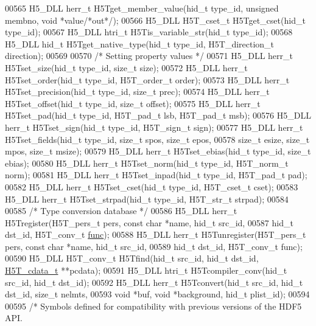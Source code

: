 \begin{DoxyCode}
00565 H5\_DLL herr\_t H5Tget\_member\_value(hid\_t type\_id, \textcolor{keywordtype}{unsigned} membno, \textcolor{keywordtype}{void} *value\textcolor{comment}{/*out*/});
00566 H5\_DLL H5T\_cset\_t H5Tget\_cset(hid\_t type\_id);
00567 H5\_DLL htri\_t H5Tis\_variable\_str(hid\_t type\_id);
00568 H5\_DLL hid\_t H5Tget\_native\_type(hid\_t type\_id, H5T\_direction\_t direction);
00569 
00570 \textcolor{comment}{/* Setting property values */}
00571 H5\_DLL herr\_t H5Tset\_size(hid\_t type\_id, \textcolor{keywordtype}{size\_t} size);
00572 H5\_DLL herr\_t H5Tset\_order(hid\_t type\_id, H5T\_order\_t order);
00573 H5\_DLL herr\_t H5Tset\_precision(hid\_t type\_id, \textcolor{keywordtype}{size\_t} prec);
00574 H5\_DLL herr\_t H5Tset\_offset(hid\_t type\_id, \textcolor{keywordtype}{size\_t} offset);
00575 H5\_DLL herr\_t H5Tset\_pad(hid\_t type\_id, H5T\_pad\_t lsb, H5T\_pad\_t msb);
00576 H5\_DLL herr\_t H5Tset\_sign(hid\_t type\_id, H5T\_sign\_t sign);
00577 H5\_DLL herr\_t H5Tset\_fields(hid\_t type\_id, \textcolor{keywordtype}{size\_t} spos, \textcolor{keywordtype}{size\_t} epos,
00578                  \textcolor{keywordtype}{size\_t} esize, \textcolor{keywordtype}{size\_t} mpos, \textcolor{keywordtype}{size\_t} msize);
00579 H5\_DLL herr\_t H5Tset\_ebias(hid\_t type\_id, \textcolor{keywordtype}{size\_t} ebias);
00580 H5\_DLL herr\_t H5Tset\_norm(hid\_t type\_id, H5T\_norm\_t norm);
00581 H5\_DLL herr\_t H5Tset\_inpad(hid\_t type\_id, H5T\_pad\_t pad);
00582 H5\_DLL herr\_t H5Tset\_cset(hid\_t type\_id, H5T\_cset\_t cset);
00583 H5\_DLL herr\_t H5Tset\_strpad(hid\_t type\_id, H5T\_str\_t strpad);
00584 
00585 \textcolor{comment}{/* Type conversion database */}
00586 H5\_DLL herr\_t H5Tregister(H5T\_pers\_t pers, \textcolor{keyword}{const} \textcolor{keywordtype}{char} *name, hid\_t src\_id,
00587                hid\_t dst\_id, H5T\_conv\_t \hyperlink{structfunc}{func});
00588 H5\_DLL herr\_t H5Tunregister(H5T\_pers\_t pers, \textcolor{keyword}{const} \textcolor{keywordtype}{char} *name, hid\_t src\_id,
00589                  hid\_t dst\_id, H5T\_conv\_t func);
00590 H5\_DLL H5T\_conv\_t H5Tfind(hid\_t src\_id, hid\_t dst\_id, \hyperlink{struct_h5_t__cdata__t}{H5T\_cdata\_t} **pcdata);
00591 H5\_DLL htri\_t H5Tcompiler\_conv(hid\_t src\_id, hid\_t dst\_id);
00592 H5\_DLL herr\_t H5Tconvert(hid\_t src\_id, hid\_t dst\_id, \textcolor{keywordtype}{size\_t} nelmts,
00593               \textcolor{keywordtype}{void} *buf, \textcolor{keywordtype}{void} *background, hid\_t plist\_id);
00594 
00595 \textcolor{comment}{/* Symbols defined for compatibility with previous versions of the HDF5 API.}

\end{DoxyCode}
